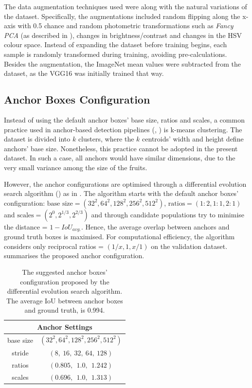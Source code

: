 The data augmentation techniques used were along with the natural variations of the dataset. Specifically, the augmentations included random flipping along the x-axis with 0.5 chance and random photometric transformations such as \textit{Fancy PCA} (as described in \cite{taylor2017improving}), changes in brightness/contrast and changes in the HSV colour space. Instead of expanding the dataset before training begins, each sample is randomly transformed during training, avoiding pre-calculations. Besides the augmentation, the ImageNet mean values were subtracted from the dataset, as the VGG16 was initially trained that way.

\subsection{Anchor Boxes Configuration}
Instead of using the default anchor boxes' base size, ratios and scales, a common practice used in anchor-based detection pipelines (\cite{redmon2017yolo9000}, \cite{redmon2018yolov3}) is k-means clustering. The dataset is divided into $k$ clusters, where the $k$ centroids' width and height define anchors' base size. Nonetheless, this practice cannot be adopted in the present dataset. In such a case, all anchors would have similar dimensions, due to the very small variance among the size of the fruits.

However, the anchor configurations are optimised through a differential evolution search algorithm (\cite{storn1997differential}) as in \cite{zlocha2019improving}. The algorithm starts with the default anchor boxes' configuration: $\text{base size} = (32^2, 64^2, 128^2, 256^2, 512^2)$, $\text{ratios} = (1\!:\!2, 1\!:\!1, 2\!:\!1)$ and $\text{scales} = (2^{0}, 2^{1/3}, 2^{2/3})$ and through candidate populations try to minimise the distance = $1 - IoU_{avg.}$. Hence, the average overlap between anchors and ground truth boxes is maximised. For computational efficiency, the algorithm considers only reciprocal ratios = $(1/x, 1, x/1)$ on the validation dataset.  summarises the proposed anchor configuration.

\begin{table}[!htb]
  \centering
  \begin{tabular}{cc}
  \toprule
  \multicolumn{2}{c}{\textbf{Anchor Settings}} \\
  \midrule
base size	& 	\small{$(32^2, 64^2, 128^2, 256^2, 512^2)$} \\
stride 	& 	$(8, \ 16, \ 32, \ 64, \ 128)$ \\
ratios  	&	$(0.805, \ \ 1.0, \ \ 1.242)$ \\
scales  	& 	$(0.696, \ \ 1.0, \ \ 1.313)$ \\
  \bottomrule
  \end{tabular}
  \caption{The suggested anchor boxes' configuration proposed by the differential evolution search algorithm. The average IoU between anchor boxes and ground truth, is 0.994.}
  \label{ch4:tab2}
\end{table}

